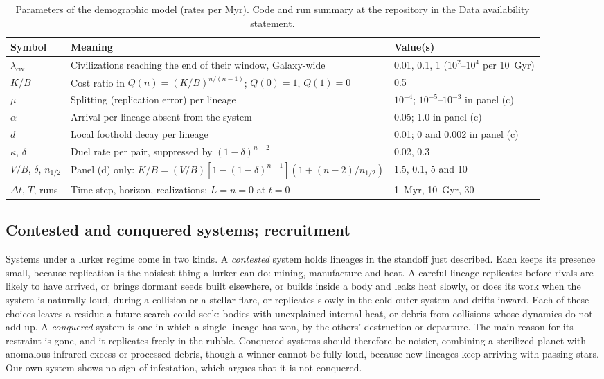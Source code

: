 \documentclass[preprint,12pt]{elsarticle}
\theoremstyle{definition}
\begin{document}
\begin{table}[!htbp]
\centering
\caption{Parameters of the demographic model (rates per Myr). Code and run summary at the repository in the Data availability statement.}
\label{tab:params}
\small
\begin{tabularx}{\textwidth}{@{}lXl@{}}
\toprule
Symbol & Meaning & Value(s) \\
\midrule
$\lambda_{\mathrm{civ}}$ & Civilizations reaching the end of their window, Galaxy-wide & 0.01, 0.1, 1 ($10^{2}$--$10^{4}$ per 10~Gyr) \\
$K/B$ & Cost ratio in $Q(n) = (K/B)^{n/(n-1)}$; $Q(0)=1$, $Q(1)=0$ & 0.5 \\
$\mu$ & Splitting (replication error) per lineage & $10^{-4}$; $10^{-5}$--$10^{-3}$ in panel (c) \\
$\alpha$ & Arrival per lineage absent from the system & 0.05; 1.0 in panel (c) \\
$d$ & Local foothold decay per lineage & 0.01; 0 and 0.002 in panel (c) \\
$\kappa$, $\delta$ & Duel rate per pair, suppressed by $(1-\delta)^{n-2}$ & 0.02, 0.3 \\
$V/B$, $\delta$, $n_{1/2}$ & Panel (d) only: $K/B = (V/B)[1-(1-\delta)^{n-1}](1 + (n-2)/n_{1/2})$ & 1.5, 0.1, 5 and 10 \\
$\Delta t$, $T$, runs & Time step, horizon, realizations; $L = n = 0$ at $t = 0$ & 1~Myr, 10~Gyr, 30 \\
\bottomrule
\end{tabularx}
\end{table}

\subsection{Contested and conquered systems; recruitment}
\label{sec:regimes}

Systems under a lurker regime come in two kinds. A \emph{contested} system holds lineages in the standoff just described. Each keeps its presence small, because replication is the noisiest thing a lurker can do: mining, manufacture and heat. A careful lineage replicates before rivals are likely to have arrived, or brings dormant seeds built elsewhere, or builds inside a body and leaks heat slowly, or does its work when the system is naturally loud, during a collision or a stellar flare, or replicates slowly in the cold outer system and drifts inward. Each of these choices leaves a residue a future search could seek: bodies with unexplained internal heat, or debris from collisions whose dynamics do not add up. A \emph{conquered} system is one in which a single lineage has won, by the others' destruction or departure. The main reason for its restraint is gone, and it replicates freely in the rubble. Conquered systems should therefore be noisier, combining a sterilized planet with anomalous infrared excess or processed debris, though a winner cannot be fully loud, because new lineages keep arriving with passing stars. Our own system shows no sign of infestation, which argues that it is not conquered.
\end{document}
